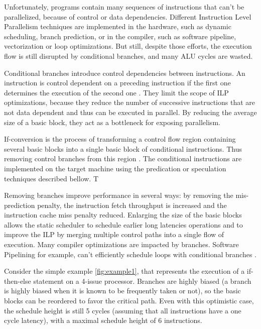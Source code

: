 Unfortunately, programs contain many sequences of instructions that can't be parallelized, because of control or data dependencies. Different Instruction Level Parallelism techniques are implemented in the hardware, such as dynamic scheduling, branch prediction, or in the compiler, such as software pipeline, vectorization or loop optimizations. But still, despite those efforts, the execution flow is still disrupted by conditional branches, and many ALU cycles are wasted. 

Conditional branches introduce control dependencies between instructions. An instruction is control dependent on a preceding instruction if the first one determines the execution of the second one \cite{Kennedy:2001:OCM:502981}. They limit the scope of ILP optimizations, because they reduce the number of successive instructions that are not data dependent and thus can be executed in parallel. By reducing the average size of a basic block, they act as a bottleneck for exposing parallelism.

If-conversion is the process of transforming a control flow region containing several basic blocks into a single basic block of conditional instructions. Thus removing control branches from this region \cite{Schlansker97achievinghigh}. The conditional instructions are implemented on the target machine using the predication or speculation techniques described bellow. T

Removing branches improve performance in several ways: by removing the mis-prediction penalty, the instruction fetch throughput is increased and the instruction cache miss penalty reduced. Enlarging the size of the basic blocks allows the static scheduler to schedule earlier long latencies operations and to improve the ILP by merging multiple control paths into a single flow of execution. Many compiler optimizations are impacted by branches. Software Pipelining for example, can't efficiently schedule loops with conditional branches \cite{Warter:1992:EMS:144953.145796}.

Consider the simple example \ref{fig:example1}, that represents the execution of a if-then-else statement on a 4-issue processor. Branches are highly biased (a branch is highly biased when it is known to be frequently taken or not), so the basic blocks can be reordered to favor the critical path. Even with this optimistic case, the schedule height is still 5 cycles (assuming that all instructions have a one cycle latency), with a maximal schedule height of 6 instructions. 

